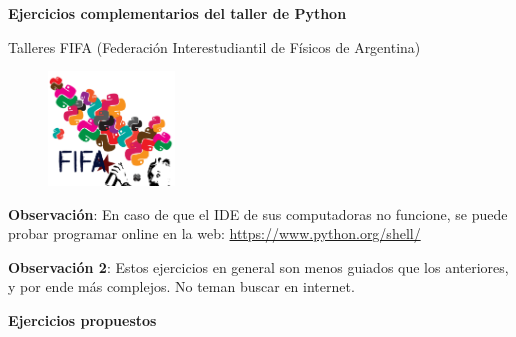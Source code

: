 \documentclass[a4paper]{article}
\begin{document}
\thispagestyle{empty}



\centerline{{\bf\Large{Ejercicios complementarios del taller de Python}}}

\centerline{{\ttfamily Talleres FIFA (Federación Interestudiantil de Físicos de Argentina)}}

\begin{figure}[H]
 \centering
   \includegraphics[width=0.3\textwidth]{logos_python_fifa.png}
 \label{FIFA}
 \end{figure}

\bigskip


\textbf{Observación}:
En caso de que el IDE de sus computadoras no funcione, se puede probar programar online en la web: \url{https://www.python.org/shell/}

\textbf{Observación 2}:
Estos ejercicios en general son menos guiados que los anteriores, y por ende más complejos. No teman buscar en internet.

\bigskip
\centerline{\bf Ejercicios propuestos}
\bigskip
\end{document}
